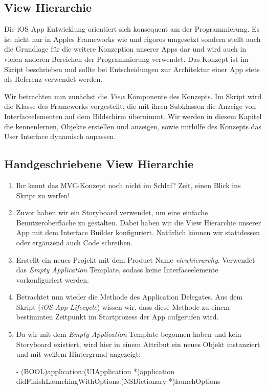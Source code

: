\documentclass[parskip=half, final]{scrreprt}
\begin{document}
\begin{lecture} %


\chapter{View Hierarchie}

Die iOS App Entwicklung orientiert sich konsequent am  der Programmierung. Es ist nicht nur in Apples Frameworks wie  und  rigoros umgesetzt sondern stellt auch die Grundlage für die weitere Konzeption unserer Apps dar und wird auch in vielen anderen Bereichen der Programmierung verwendet. Das Konzept ist im Skript beschrieben und sollte bei Entscheidungen zur Architektur einer App stets als Referenz verwendet werden.


Wir betrachten nun zunächst die \emph{View} Komponente des Konzepts. Im Skript wird die  Klasse des  Frameworks vorgestellt, die mit ihren Subklassen die Anzeige von Interfaceelementen auf dem Bildschirm übernimmt. Wir werden in diesem Kapitel die  kennenlernen,  Objekte erstellen und anzeigen, sowie mithilfe des  Konzepts das User Interface dynamisch anpassen.


\section{Handgeschriebene View Hierarchie}

\mvcindicatorview


\begin{enumerate}
\item Ihr kennt das MVC-Konzept noch nicht im Schlaf? Zeit, einen Blick ins Skript zu werfen!
\item Zuvor haben wir ein Storyboard verwendet, um eine einfache Benutzeroberfläche zu gestalten. Dabei haben wir die View Hierarchie unserer App mit dem Interface Builder konfiguriert. Natürlich können wir stattdessen oder ergänzend auch Code schreiben.
\item Erstellt ein neues Projekt mit dem Product Name \emph{viewhierarchy}. Verwendet das \emph{Empty Application} Template, sodass keine Interfaceelemente vorkonfiguriert werden.
\item Betrachtet nun wieder die  Methode des Application Delegates. Aus dem Skript (\emph{iOS App Lifecycle}) wissen wir, dass diese Methode zu einem bestimmten Zeitpunkt im Startprozess der App aufgerufen wird.
\item Da wir mit dem \emph{Empty Application} Template begonnen haben und kein Storyboard existiert, wird hier in einem Attribut  ein neues Objekt instanziert und mit weißem Hintergrund angezeigt:
\begin{objclst}
- (BOOL)application:(UIApplication *)application didFinishLaunchingWithOptions:(NSDictionary *)launchOptions {

}
\end{objclst}
\end{enumerate}
\end{lecture}
\end{document}
